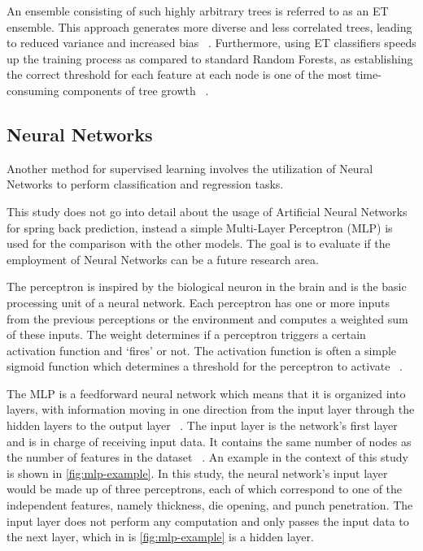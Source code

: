 An ensemble consisting of such highly arbitrary trees is referred to as an \ac{ET} ensemble.
This approach generates more diverse and less correlated trees, leading to reduced variance and increased
bias
~\cite[p. 351]{geron2022hands}.
Furthermore, using ET classifiers speeds up the training process as compared to standard Random Forests, as
establishing the correct threshold for each feature at each node is one of the most time-consuming components of tree
growth
~\cite[p. 351]{geron2022hands}.

\subsection{Neural Networks}\label{subsec:neural-networks}
Another method for supervised learning involves the utilization of Neural Networks to
perform classification and regression tasks.

This study does not go into detail about the usage of Artificial Neural Networks for spring back prediction,
instead a simple Multi-Layer Perceptron (MLP) is used for the comparison with the other models.
The goal is to evaluate if the employment of Neural Networks can be a future research area.

The perceptron is inspired by the biological neuron in the brain and is the basic processing unit of a neural
network.
Each perceptron has one or more inputs from the previous perceptions or the environment and computes a weighted sum of
these inputs.
The weight determines if a perceptron triggers a certain activation function and `fires' or
not.
The activation function is often a simple sigmoid function which determines a threshold for the perceptron to activate
~\cite[pp. 271--273]{alpaydin2020introduction}.

The MLP is a feedforward neural network which means that it is organized into layers, with information
moving in one direction from the input layer through the hidden layers to the output
layer
~\cite[pp. 279--280]{bishop1995neural}.
The input layer is the network's first layer and is in charge of receiving input data.
It contains the same number of nodes as the number of features in the dataset
~\cite[p. 105]{muller2016introduction}.
An example in the context of this study is shown in \cref{fig:mlp-example}.
In this study, the neural network's input layer would be made up of three perceptrons, each of which correspond
to one of the independent features, namely thickness, die opening, and punch penetration.
The input layer does not perform any computation and only passes the input data to the next layer, which in is
\cref{fig:mlp-example} is a hidden layer.

